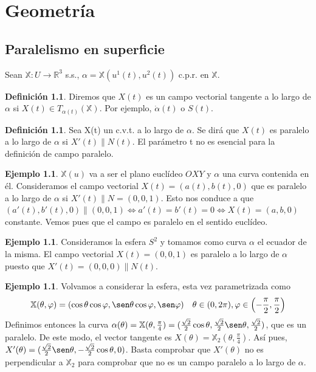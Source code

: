 \documentclass[twoside]{report}
\theoremstyle{definition}
\newtheorem{defi}[theorem]{Definición}
\newtheorem{example}[theorem]{Ejemplo}
\numberwithin{equation}{section}
\newcommand{\R}{\mathbb{R}}
\newcommand{\X}{\mathbb{X}}
\begin{document}
\chapter{Geometría}
\section{Paralelismo en superficie}
Sean $\X:U\to\R^3$ s.s., $\alpha=\X(u^1(t),u^2(t))$ c.p.r. en $\X$.

\begin{defi}
Diremos que $X(t)$ es un campo vectorial tangente a lo largo de $\alpha$ si $X(t) \in T_{\alpha(t)}(\X)$. Por ejemplo, $\dot{\alpha}(t)$ o $S(t)$.
\end{defi}

\begin{defi}
Sea X(t) un c.v.t. a lo largo de $\alpha$. Se dirá que $X(t)$ es paralelo a lo largo de $\alpha$ si $X'(t) \parallel N(t)$. El parámetro t no es esencial para la definición de campo paralelo.
\end{defi}

\begin{example}
$\X(u)$ va a ser el plano euclídeo $OXY$ y $\alpha$ una curva contenida en él. Consideramos el campo vectorial $X(t)=(a(t),b(t),0)$ que es paralelo a lo largo de $\alpha$ si $X'(t)\parallel N=(0,0,1)$. Esto nos conduce a que $(a'(t),b'(t),0)\parallel (0,0,1)\Leftrightarrow a'(t)=b'(t)=0\Leftrightarrow X(t)=(a,b,0)$ constante. Vemos pues que el campo es paralelo en el sentido euclídeo.
\end{example}

\begin{example}
Consideramos la esfera $S^2$ y tomamos como curva $\alpha$ el ecuador de la misma. El campo vectorial $X(t)=(0,0,1)$ es paralelo a lo largo de $\alpha$ puesto que $X'(t)=(0,0,0)\parallel N(t)$.
\end{example}

\begin{example}
Volvamos a considerar la esfera, esta vez parametrizada como
\[ \X(\theta,\varphi)=(\cos\theta\cos\varphi,\sen\theta\cos\varphi,\sen\varphi)\quad \theta\in(0,2\pi),\varphi\in\left(-\frac{\pi}{2},\frac{\pi}{2}\right)\]
Definimos entonces la curva $\alpha(\theta)=\X(\theta,\frac{\pi}{4})=(\frac{\sqrt{2}}{2}\cos\theta,\frac{\sqrt{2}}{2}\sen\theta,\frac{\sqrt{2}}{2})$, que es un paralelo. De este modo, el vector tangente es $X(\theta)=\X_2(\theta,\frac{\pi}{4})$. Así pues, $X'(\theta)=(\frac{\sqrt{2}}{2}\sen\theta,-\frac{\sqrt{2}}{2}\cos\theta,0)$. Basta comprobar que $X'(\theta)$ no es perpendicular a $\X_2$ para comprobar que no es un campo paralelo a lo largo de $\alpha$.
\end{example}
\end{document}
